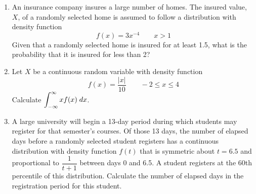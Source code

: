 \documentclass[../main.tex]{subfiles}
\begin{document}
\begin{exercises}
\begin{enumerate}
	\item %
	An insurance company insures a large number of homes. The insured value,
	$X$, of a randomly selected home is assumed to follow a distribution with
	density function
	$$f(x) = 3x^{-4} \qquad x>1$$
	Given that a randomly selected home is insured for at least
	1.5, what is the probability that it is insured for less than 
	2?
	
	\item %
	Let $X$ be a continuous random variable with density function
	$$f(x) = \dfrac{|x|}{10} \qquad -2 \leq x \leq 4$$
	Calculate $\displaystyle \int_{-\infty}^\infty xf(x)\;dx$.
	
	\item %
	A large university will begin a 13-day period during which students may register for that semester’s courses. Of those 13 days, the number of elapsed days
	before a randomly selected student registers has a continuous distribution
	with density function $f(t)$ that is symmetric about $t = 6.5$ and proportional
	to $\dfrac{1}{t+1}$
	between days 0 and 6.5.
	A student registers at the 60th percentile of this distribution. Calculate the
	number of elapsed days in the registration period for this student.
	
\end{enumerate}
\end{exercises}
\end{document}
